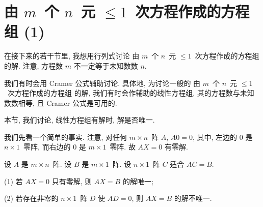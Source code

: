 \documentclass[../libro.tex]{subfiles}
\begin{document}

\KunAsteriskoEnEnhavtabelo
\section{\texorpdfstring{由 \(m\)~个 \(n\)~元
    \({\leq} 1\)~次方程作成的方程组 (1)}%
{由 m 个 n 元 ≤1 次方程作成的方程组 (1)}}
\SenAsteriskoEnEnhavtabelo

\maldevigalegajxo

在接下来的若干节里, 我想用行列式讨论%
由 \(m\)~个 \(n\)~元 \({\leq} 1\)~次方程作成的方程组%
的解.
注意, 方程数 \(m\) 不一定等于未知数数 \(n\).

我们有时会用 Cramer 公式辅助讨论.
具体地, 为讨论一般的%
由 \(m\)~个 \(n\)~元 \({\leq} 1\)~次方程作成的方程组%
的解,
我们有时会作辅助的线性方程组,
其的方程数与未知数数相等,
且 Cramer 公式是可用的.

本节, 我们讨论, 线性方程组有解时, 解是否唯一.

我们先看一个简单的事实.
注意, 对任何 \(m \times n\)~阵 \(A\),
\(A 0 = 0\),
其中, 左边的 \(0\) 是 \(n \times 1\)~零阵,
而右边的 \(0\) 是 \(m \times 1\)~零阵.
故 \(A X = 0\) 有零解.

\begin{theorem}
    设 \(A\) 是 \(m \times n\)~阵.
    设 \(B\) 是 \(m \times 1\)~阵.
    设 \(n \times 1\)~阵 \(C\) 适合 \(AC = B\).

    (1)
    若 \(AX = 0\) 只有零解, 则 \(AX = B\) 的解唯一;

    (2)
    若存在非零的 \(n \times 1\)~阵 \(D\)
    使 \(AD = 0\),
    则 \(AX = B\) 的解不唯一.
\end{theorem}
\end{document}
